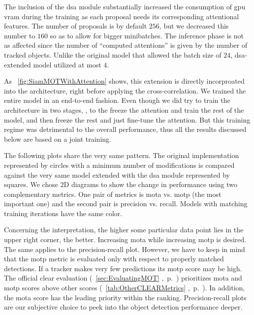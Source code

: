 The inclusion of the \gls{dsa} module substantially increased the consumption of \gls{gpu} \gls{vram} during the training as each proposal needs its corresponding attentional features. The number of proposals is by default $256$, but we decreased this number to $160$ so as to allow for bigger minibatches. The inference phase is not as affected since the number of ``computed attentions'' is given by the number of tracked objects. Unlike the original model that allowed the batch size of $24$, \gls{dsa}-extended model utilized at most $4$.

As \figtext{}~\ref{fig:SiamMOTWithAttention} shows, this extension is directly incorproated into the architecture, right before applying the cross-correlation. We trained the entire model in an end-to-end fashion. Even though we did try to train the architecture in two stages, \ietext{}, to the freeze the attention and train the rest of the model, and then freeze the rest and just fine-tune the attention. But this training regime was detrimental to the overall performance, thus all the results discussed below are based on a joint training.

The following plots share the very same pattern. The original implementation represented by circles with a minimum number of modifications is compared against the very same model extended with the \gls{dsa} module represented by squares. We chose $2$D diagrams to show the change in performance using two complementary metrics. One pair of metrics is \gls{mota} vs. \gls{motp} (the most important one) and the second pair is precision vs. recall. Models with matching training iterations have the same color.

Concerning the interpretation, the higher some particular data point lies in the upper right corner, the better. Increasing \gls{mota} while increasing \gls{motp} is desired. The same applies to the precision-recall plot. However, we have to keep in mind that the \gls{motp} metric is evaluated only with respect to properly matched detections. If a tracker makes very few predictions its \gls{motp} score may be high. The official \gls{clear} evaluation (\sectiontext{}~\ref{sec:EvaluatingMOT} ,~p.~\pageref{sec:EvaluatingMOT}) prioritizes \gls{mota} and \gls{motp} scores above other scores (\tabletext{}~\ref{tab:OtherCLEARMetrics} ,~p.~\pageref{tab:OtherCLEARMetrics}). In addition, the \gls{mota} score has the leading priority within the ranking. Precision-recall plots are our subjective choice to peek into the object detection performance deeper.

